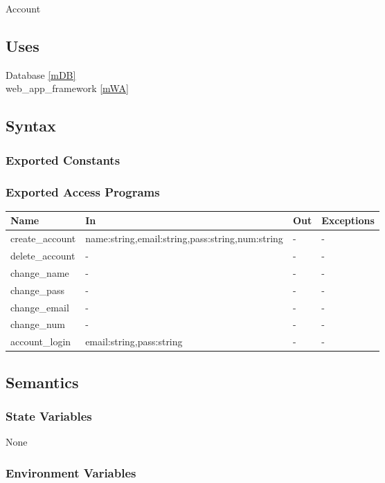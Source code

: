 \documentclass[12pt, titlepage]{article}
\begin{document}
Account

\subsection{Uses}

Database \ref{mDB} \\
web\_app\_framework \ref{mWA}

\subsection{Syntax}

\subsubsection{Exported Constants}

\subsubsection{Exported Access Programs}

\begin{center}
\begin{tabular}{p{3cm} p{9cm} p{2cm} p{2cm}}
\hline
\textbf{Name} & \textbf{In} & \textbf{Out} & \textbf{Exceptions} \\
\hline
create\_account & name:string,email:string,pass:string,num:string & - & - \\
delete\_account & - & - & - \\
change\_name & - & - & - \\
change\_pass & - & - & - \\
change\_email & - & - & - \\
change\_num & - & - & - \\
account\_login & email:string,pass:string & - & - \\
\hline
\end{tabular}
\end{center}

\subsection{Semantics}

\subsubsection{State Variables}

None

\subsubsection{Environment Variables}
\end{document}
